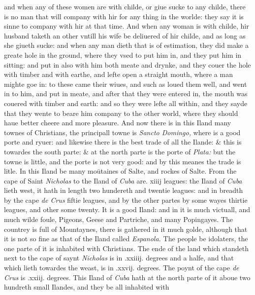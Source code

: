 \documentclass[11pt,twoside]{article}\makeatletter
\begin{document}
 and when any of these women are with childe, or giue sucke to any childe, there is no man that will company with hir for any thing in the worlde: they say it is sinne to company with hir at that time. And when any woman is with childe, hir husband taketh an other vntill his wife be deliuered of hir childe, and as long as she giueth sucke: and when any man dieth that is of estimation, they did make a greate hole in the ground, where they vsed to put him in, and they put him in sitting: and put in also with him both meate and drynke, and they couer the hole with timber and with earthe, and lefte open a straight mouth, where a man mighte goe in: to these came their wiues, and such as loued them well, and went in to him, and put in meate, and after that they were entered in, the mouth was couered with timber and earth: and so they were lefte all within, and they sayde that they wente to beare him company to the other world, where they should haue bet­ter cheere and more pleasure. And now there is in this Iland many townes of Christians, the principall towne is {\itshape Sancto Domingo,} where is a good porte and ryuer: and likewise there is the best trade of all the Ilande: \& this is towardes the south parte: \& at the north parte is the porte of {\itshape Plata:} but the towne is little, and the porte is not very good: and by this meanes the trade is litle. In this Iland be many moūtaines of Salte, and rockes of Salte. From the cape of Saint {\itshape Nicholas} to the Iland of {\itshape Cuba} are. xiiij leagues: the Iland of {\itshape Cuba} lieth west, it hath in length two hundereth and twentie leagues: and in 
	\normalmarginpar
       breadth by the cape {\itshape de Crus} fiftie leagues, and by the other partes by some wayes thirtie leagues, and other some twen­ty. It is a good Iland: and in it is much victuall, and much wilde foule, Pigeons, Geese and Partriche, and many Po­pingayes. The countrey is full of Mountaynes, there is ga­thered in it much golde, although that it is not so fine as that of the Iland called {\itshape Espanola.} The people be idolaters, the one parte of it is inhabited with Christians. The ende of the land which standeth next to the cape of saynt {\itshape Nicholas} is in .xxiiij. %
 degrees and a halfe, and that which lieth towardes the weast, is in .xxvij. degrees. The poynt of the cape {\itshape de Crus} is .xxiij. de­grees. 
	\normalmarginpar
       This Iland of {\itshape Cuba} hath at the north parte of it aboue two hundreth small Ilandes, and they be all inhabited with 
\end{document}
